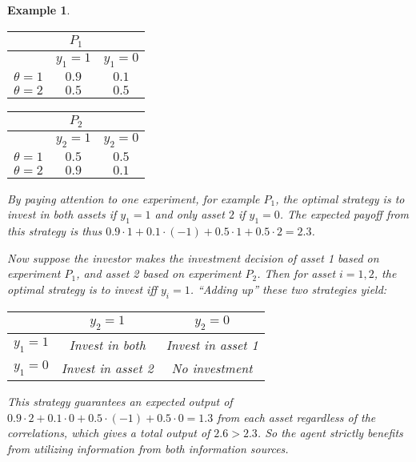 \documentclass[11pt]{article}
\theoremstyle{plain}
\newtheorem{ex}{Example}
\theoremstyle{remark}
\begin{document}
\begin{ex}
\begin{tabular}{  |c | c |c|}
           \multicolumn{3}{c}{$P_1$}      \\\hline
           &  $y_1=1$ & $y_1=0$\\ \hline
          $\theta=1$ & $0.9$ & $0.1$\\ \hline
          $\theta=2$ & $0.5$ & $0.5$\\ \hline
\end{tabular}
\hfill
\begin{tabular}{  |c | c |c|}
          \multicolumn{3}{c}{$P_2$}      \\ \hline
        &  $y_2=1$ & $y_2=0$\\ \hline
          $\theta=1$ & $0.5$ & $0.5$\\ \hline
          $\theta=2$ & $0.9$ & $0.1$\\ \hline
\end{tabular}
\hspace{0.5in}
\vspace{0.2in}



By paying attention to one experiment, for example $P_1$, the optimal strategy is to invest in both assets if $y_1=1$ and only asset $2$ if $y_1=0$. The expected payoff from this strategy is thus $0.9\cdot 1+0.1\cdot (-1)+0.5\cdot 1+0.5\cdot 2=2.3$.

Now suppose the investor makes the investment decision of asset 1 based on experiment $P_1$, and asset 2 based on experiment $P_2$. Then for asset $i=1,2$, the optimal strategy is to invest iff $y_{i}=1$. ``Adding up'' these two strategies yield:

\begin{center}
     \begin{tabular}{  |c | c |c|}
           \hline
        &  $y_2=1$ & $y_2=0$\\ \hline
          $y_1=1$  & Invest in both & Invest in asset 1\\ \hline
            $y_1=0$  & Invest in asset 2 & No investment\\ \hline
    \end{tabular}
\end{center}

This strategy guarantees an expected output of $0.9\cdot 2+0.1\cdot 0+0.5\cdot (-1)+0.5\cdot 0=1.3$ from each asset regardless of the correlations, which gives a total output of $2.6>2.3$. So the agent strictly benefits from utilizing information from both information sources.
\end{ex}
\end{document}
